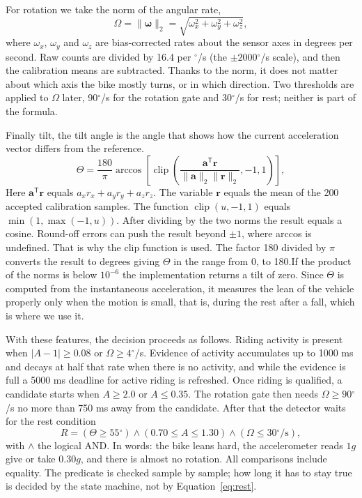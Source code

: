 \documentclass[10pt,a4paper]{article}
\newcommand{\degree}{\ensuremath{^{\circ}}}
\begin{document}
For rotation we take the norm of the angular rate,
\begin{equation}\label{eq:rotation}
\Omega=\|\boldsymbol\omega\|_2=\sqrt{\omega_x^2+\omega_y^2+\omega_z^2},
\end{equation}
where $\omega_x$, $\omega_y$ and $\omega_z$ are bias-corrected rates about the sensor axes in degrees per second. Raw counts are divided by 16.4 per $\degree$/s (the $\pm2000\degree$/s scale), and then the calibration means are subtracted. Thanks to the norm, it does not matter about which axis the bike mostly turns, or in which direction. Two thresholds are applied to $\Omega$ later, 90$\degree$/s for the rotation gate and 30$\degree$/s for rest; neither is part of the formula.

Finally tilt, the tilt angle is the angle that shows how the current acceleration vector differs from the reference.
\begin{equation}\label{eq:tilt}
\Theta=\frac{180}{\pi}\arccos\!\left[\operatorname{clip}\left(\frac{\mathbf a^{\mathsf T}\mathbf r}{\|\mathbf a\|_2\|\mathbf r\|_2},-1,1\right)\right],
\end{equation}
Here $\mathbf a^{\mathsf T}\mathbf r$ equals $a_xr_x+a_yr_y+a_zr_z$. The variable $\mathbf r$ equals the mean of the 200 accepted calibration samples. The function $\operatorname{clip}(u,-1,1)$ equals $\min(1,\max(-1,u))$. After dividing by the two norms the result equals a cosine. Round-off errors can push the result beyond $\pm1$, where arccos is undefined. That is why the clip function is used. The factor 180 divided by $\pi$ converts the result to degrees giving $\Theta$ in the range from 0, to 180.If the product of the norms is below $10^{-6}$ the implementation returns a tilt of zero. Since $\Theta$ is computed from the instantaneous acceleration, it measures the lean of the vehicle properly only when the motion is small, that is, during the rest after a fall, which is where we use it.

With these features, the decision proceeds as follows. Riding activity is present when $|A-1|\geq0.08$ or $\Omega\geq4\degree$/s. Evidence of activity accumulates up to 1000 ms and decays at half that rate when there is no activity, and while the evidence is full a 5000 ms deadline for active riding is refreshed. Once riding is qualified, a candidate starts when $A\geq2.0$ or $A\leq0.35$. The rotation gate then needs $\Omega\geq90\degree$/s no more than 750 ms away from the candidate. After that the detector waits for the rest condition
\begin{equation}
 \label{eq:rest} R=(\Theta\geq55\degree)\land(0.70\leq A\leq1.30)\land(\Omega\leq30\degree/\mathrm{s}),
\end{equation}
with $\land$ the logical AND. In words: the bike leans hard, the accelerometer reads $1g$ give or take $0.30g$, and there is almost no rotation. All comparisons include equality. The predicate is checked sample by sample; how long it has to stay true is decided by the state machine, not by Equation~\eqref{eq:rest}.
\end{document}
